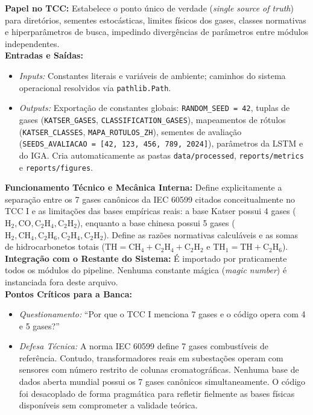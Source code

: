 \documentclass[10pt,a4paper]{article}
\begin{document}
\begin{filebox}
\textbf{Papel no TCC:} Estabelece o ponto único de verdade (\textit{single source of truth}) para diretórios, sementes estocásticas, limites físicos dos gases, classes normativas e hiperparâmetros de busca, impedindo divergências de parâmetros entre módulos independentes.\\
\textbf{Entradas e Saídas:}
\begin{itemize}[leftmargin=*,itemsep=1pt]
  \item \textit{Inputs:} Constantes literais e variáveis de ambiente; caminhos do sistema operacional resolvidos via \texttt{pathlib.Path}.
  \item \textit{Outputs:} Exportação de constantes globais: \texttt{RANDOM\_SEED = 42}, tuplas de gases (\texttt{KATSER\_GASES}, \texttt{CLASSIFICATION\_GASES}), mapeamentos de rótulos (\texttt{KATSER\_CLASSES}, \texttt{MAPA\_ROTULOS\_ZH}), sementes de avaliação (\texttt{SEEDS\_AVALIACAO = [42, 123, 456, 789, 2024]}), parâmetros da LSTM e do IGA. Cria automaticamente as pastas \texttt{data/processed}, \texttt{reports/metrics} e \texttt{reports/figures}.
\end{itemize}
\textbf{Funcionamento Técnico e Mecânica Interna:} Define explicitamente a separação entre os 7 gases canônicos da IEC 60599 citados conceitualmente no TCC I e as limitações das bases empíricas reais: a base Katser possui 4 gases ($\text{H}_2, \text{CO}, \text{C}_2\text{H}_4, \text{C}_2\text{H}_2$), enquanto a base chinesa possui 5 gases ($\text{H}_2, \text{CH}_4, \text{C}_2\text{H}_6, \text{C}_2\text{H}_4, \text{C}_2\text{H}_2$). Define as razões normativas calculáveis e as somas de hidrocarbonetos totais ($\text{TH} = \text{CH}_4 + \text{C}_2\text{H}_4 + \text{C}_2\text{H}_2$ e $\text{TH}_1 = \text{TH} + \text{C}_2\text{H}_6$).\\
\textbf{Integração com o Restante do Sistema:} É importado por praticamente todos os módulos do pipeline. Nenhuma constante mágica (\textit{magic number}) é instanciada fora deste arquivo.\\
\textbf{Pontos Críticos para a Banca:}
\begin{itemize}[leftmargin=*,itemsep=1pt]
  \item \textit{Questionamento:} ``Por que o TCC I menciona 7 gases e o código opera com 4 e 5 gases?''
  \item \textit{Defesa Técnica:} A norma IEC 60599 define 7 gases combustíveis de referência. Contudo, transformadores reais em subestações operam com sensores com número restrito de colunas cromatográficas. Nenhuma base de dados aberta mundial possui os 7 gases canônicos simultaneamente. O código foi desacoplado de forma pragmática para refletir fielmente as bases físicas disponíveis sem comprometer a validade teórica.
\end{itemize}
\end{filebox}
\end{document}
